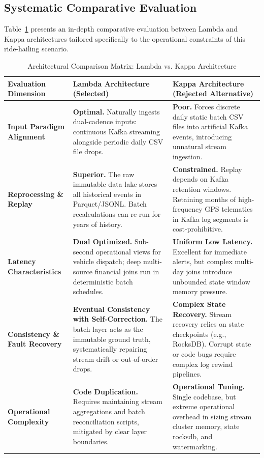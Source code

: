 \documentclass[11pt,a4paper]{article}
\begin{document}
\subsection{Systematic Comparative Evaluation}
Table~\ref{tab:lambda_vs_kappa_matrix} presents an in-depth comparative evaluation between Lambda and Kappa architectures tailored specifically to the operational constraints of this ride-hailing scenario.

\begin{table}[htbp]
\centering
\footnotesize
\caption{Architectural Comparison Matrix: Lambda vs. Kappa Architecture}
\label{tab:lambda_vs_kappa_matrix}
\begin{tabularx}{\textwidth}{p{3.0cm}X X}
\toprule
\textbf{Evaluation Dimension} & \textbf{Lambda Architecture (Selected)} & \textbf{Kappa Architecture (Rejected Alternative)} \\
\midrule
\textbf{Input Paradigm Alignment} & \textbf{Optimal.} Naturally ingests dual-cadence inputs: continuous Kafka streaming alongside periodic daily CSV file drops. & \textbf{Poor.} Forces discrete daily static batch CSV files into artificial Kafka events, introducing unnatural stream ingestion. \\
\addlinespace
\textbf{Reprocessing \& Replay} & \textbf{Superior.} The raw immutable data lake stores all historical events in Parquet/JSONL. Batch recalculations can re-run for years of history. & \textbf{Constrained.} Replay depends on Kafka retention windows. Retaining months of high-frequency GPS telematics in Kafka log segments is cost-prohibitive. \\
\addlinespace
\textbf{Latency Characteristics} & \textbf{Dual Optimized.} Sub-second operational views for vehicle dispatch; deep multi-source financial joins run in deterministic batch schedules. & \textbf{Uniform Low Latency.} Excellent for immediate alerts, but complex multi-day joins introduce unbounded state window memory pressure. \\
\addlinespace
\textbf{Consistency \& Fault Recovery} & \textbf{Eventual Consistency with Self-Correction.} The batch layer acts as the immutable ground truth, systematically repairing stream drift or out-of-order drops. & \textbf{Complex State Recovery.} Stream recovery relies on state checkpoints (e.g., RocksDB). Corrupt state or code bugs require complex log rewind pipelines. \\
\addlinespace
\textbf{Operational Complexity} & \textbf{Code Duplication.} Requires maintaining stream aggregations and batch reconciliation scripts, mitigated by clear layer boundaries. & \textbf{Operational Tuning.} Single codebase, but extreme operational overhead in sizing stream cluster memory, state rocksdb, and watermarking. \\
\bottomrule
\end{tabularx}
\end{table}
\end{document}

